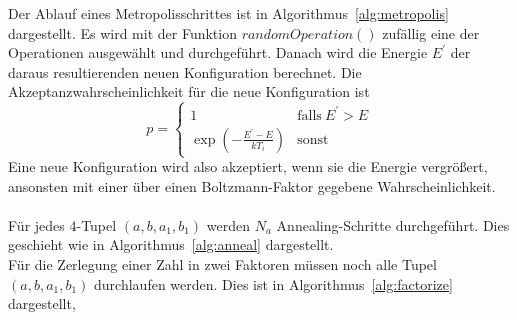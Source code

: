 Der Ablauf eines Metropolisschrittes ist in Algorithmus~\ref{alg:metropolis} dargestellt. Es wird mit der Funktion $\mathrm{\textit{randomOperation}}\left(\right)$ zufällig eine der Operationen ausgewählt und durchgeführt. Danach wird die Energie $E^\prime$ der daraus resultierenden neuen Konfiguration berechnet. Die Akzeptanzwahrscheinlichkeit für die neue Konfiguration ist
\begin{equation*}
		p=\begin{cases}
				1 & \mathrm{falls}\: E^\prime > E \\
				\exp\left(-\frac{E^\prime-E}{k T_i}\right) & \mathrm{sonst}
		\end{cases}
\end{equation*}
Eine neue Konfiguration wird also akzeptiert, wenn sie die Energie vergrößert, ansonsten mit einer über einen Boltzmann-Faktor gegebene Wahrscheinlichkeit. \\
\\
Für jedes $4$-Tupel $\left(a,b,a_1,b_1\right)$ werden $N_a$ Annealing-Schritte durchgeführt. Dies geschieht wie in Algorithmus~\ref{alg:anneal} dargestellt.
\\
Für die Zerlegung einer Zahl in zwei Faktoren müssen noch alle Tupel $\left(a,b,a_1,b_1\right)$ durchlaufen werden. Dies ist in Algorithmus~\ref{alg:factorize} dargestellt,
\\


